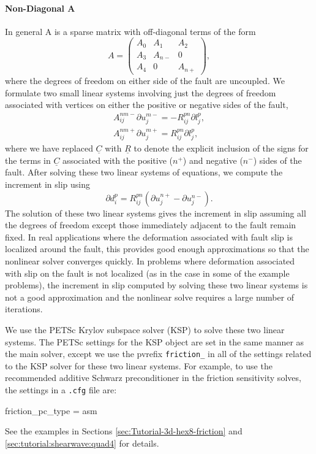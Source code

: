 \paragraph{Non-Diagonal A}

In general A is a sparse matrix with off-diagonal terms of the form
\begin{equation}
A=\left(\begin{array}{ccc}
A_{0} & A_{1} & A_{2}\\
A_{3} & A_{n-} & 0\\
A_{4} & 0 & A_{n+}
\end{array}\right),
\end{equation}
where the degrees of freedom on either side of the fault are uncoupled.
We formulate two small linear systems involving just the degrees of
freedom associated with vertices on either the positive or negative
sides of the fault,
\begin{gather}
A_{ij}^{nm-}\partial u_{j}^{m-}=-R_{ij}^{pn}\partial l_{j}^{p},\\
A_{ij}^{nm+}\partial u_{j}^{m+}=R_{ij}^{pn}\partial l_{j}^{p},
\end{gather}
where we have replaced $\underline{C}$ with $\underline{R}$ to denote
the explicit inclusion of the signs for the terms in $\underline{C}$
associated with the positive ($n^{+}$) and negative ($n^{-}$) sides
of the fault. After solving these two linear systems of equations,
we compute the increment in slip using
\begin{equation}
\partial d_{i}^{p}=R_{ij}^{pn}(\partial u_{j}^{n+}-\partial u_{j}^{n-}).
\end{equation}
The solution of these two linear systems gives the increment in slip
assuming all the degrees of freedom except those immediately adjacent
to the fault remain fixed. In real applications where the deformation
associated with fault slip is localized around the fault, this provides
good enough approximations so that the nonlinear solver converges
quickly. In problems where deformation associated with slip on the
fault is not localized (as in the case in some of the example problems),
the increment in slip computed by solving these two linear systems
is not a good approximation and the nonlinear solve requires a large
number of iterations.

We use the PETSc Krylov subspace solver (KSP) to solve these two linear
systems. The PETSc settings for the KSP object are set in the same
manner as the main solver, except we use the pvrefix \texttt{friction\_}
in all of the settings related to the KSP solver for these two linear
systems. For example, to use the recommended additive Schwarz preconditioner
in the friction sensitivity solves, the settings in a \texttt{.cfg}
file are:
\begin{lyxcode}

friction\_pc\_type = asm
\end{lyxcode}
See the examples in Sections \vref{sec:Tutorial-3d-hex8-friction}
and \vref{sec:tutorial:shearwave:quad4} for details.


